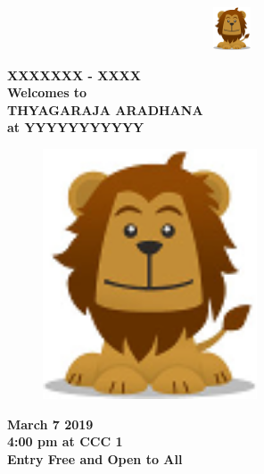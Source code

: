 \documentclass[10pt,letterpaper,twocolumn,landscape]{article}
\begin{document}
\begin{figure}[h]
\begin{center}
\includegraphics[width=4.5in,height=0.5in]{logo.png}
\end{center}
\end{figure}

\begin{center}
{\bf 
{\huge XXXXXXX - XXXX}\\\vspace{12pt}
{\Large Welcomes to \\\vspace{12pt}}
{\huge THYAGARAJA ARADHANA\\}\vspace{12pt}
{\Large at YYYYYYYYYYY\\}
}
\end{center}

\begin{figure}[h]
\begin{center}
\includegraphics[width=2.5in]{logo.png}
\end{center}
\end{figure}

\begin{center}
{\bf 
\Large{March 7 2019\\\vspace{3pt} 4:00 pm at CCC 1\\\vspace{10pt}}
Entry Free and Open to All 
}
\end{center}


\newpage

\end{document}
